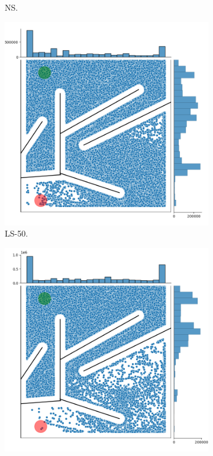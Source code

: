 \begin{figure}[H]
\begin{mdframed}
\begin{subfigure}[b]{0.5\textwidth}
            \caption{NS.}
        \end{subfigure}
        \begin{subfigure}[b]{0.5\textwidth}
            \includegraphics[scale=0.3]{resources/mazes/fitness_novelty_open.png}
            \caption{LS-50.}
        \end{subfigure}
        \begin{subfigure}[b]{0.5\textwidth}
            \includegraphics[scale=0.3]{resources/mazes/dynamic_open.png}

\end{subfigure}
\end{mdframed}
\end{figure}
